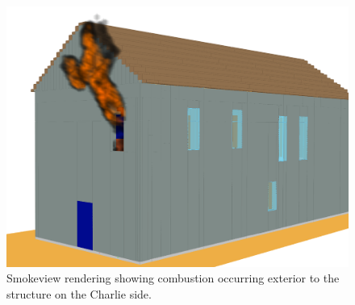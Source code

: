 \documentclass[11pt,oneside]{book}
\begin{document}
\begin{figure}[h!]
\centering
\includegraphics[width=.675\textwidth]{../Figures/smv_exterior_fire}
\caption{Smokeview rendering showing combustion occurring exterior to the structure on the Charlie side.}
\label{fig:smv_ext_fire}
\end{figure}
\end{document}

